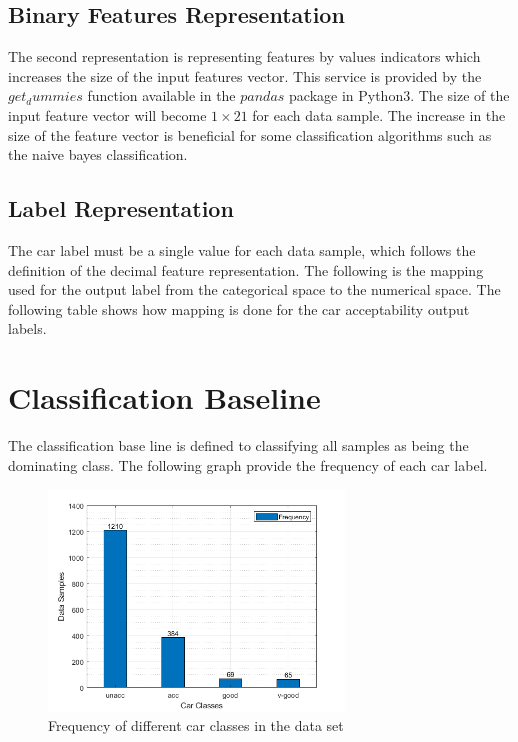 \documentclass{article}
\begin{document}


\subsection{Binary Features Representation}
The second representation is representing features by values indicators which increases the size of the input features vector. This service is provided by the $get_dummies$ function available in the $pandas$ package in Python3. The size of the input feature vector will become $1 \times 21$ for each data sample. The increase in the size of the feature vector is beneficial for some classification algorithms such as the naive bayes classification.

\subsection{Label Representation}
The car label must be a single value for each data sample, which follows the definition of the decimal feature representation. The following is the mapping used for the output label from the categorical space to the numerical space. The following table shows how mapping is done for the car acceptability output labels. 




\section{Classification Baseline}
The classification base line is defined to classifying all samples as being the dominating class. The following graph provide the frequency of each car label.

\begin{figure}[H]
\centering
\includegraphics[width=0.7\textwidth]{../Figures/baseline_bar.png}
\caption{Frequency of different car classes in the data set}
\end{figure}
\end{document}
